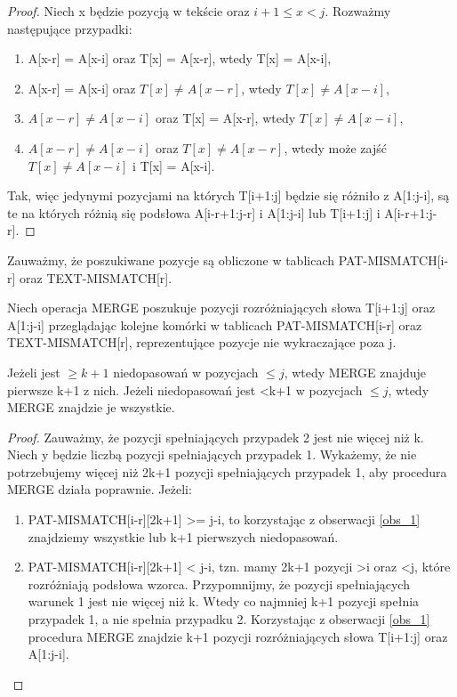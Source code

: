 \begin{proof}
Niech x będzie pozycją w tekście oraz $i+1\leq x < j$. Rozważmy następujące przypadki:
\begin{enumerate}
    \item A[x-r] = A[x-i] oraz T[x] = A[x-r], wtedy T[x] = A[x-i],
    \item A[x-r] = A[x-i] oraz $T[x] \neq A[x-r]$, wtedy $T[x] \neq A[x-i]$, 
    \item $A[x-r] \neq A[x-i]$ oraz T[x] = A[x-r], wtedy
    $T[x] \neq A[x-i]$,
    \item $A[x-r] \neq A[x-i]$ oraz $T[x] \neq A[x-r]$, wtedy może zajść $T[x] \neq A[x-i]$ i T[x] = A[x-i].
\end{enumerate}
Tak, więc jedynymi pozycjami na których T[i+1:j] będzie się różniło z A[1:j-i], są te na których różnią się podsłowa A[i-r+1:j-r] i A[1:j-i] lub T[i+1:j] i A[i-r+1:j-r].
\end{proof}

Zauważmy, że poszukiwane pozycje są obliczone w tablicach PAT-MISMATCH[i-r] oraz TEXT-MISMATCH[r].

Niech operacja MERGE poszukuje pozycji rozróżniających słowa T[i+1:j] oraz A[1:j-i] przeglądając kolejne komórki w tablicach PAT-MISMATCH[i-r] oraz TEXT-MISMATCH[r], reprezentujące pozycje nie wykraczające poza j.
\begin{lemma}{}{}
\label{lem:pozycje}
Jeżeli jest $\geq k+1$ niedopasowań w pozycjach $\leq j$, wtedy MERGE znajduje pierwsze k+1 z nich. Jeżeli niedopasowań jest <k+1 w pozycjach $\leq j$, wtedy MERGE znajdzie je wszystkie. 
\end{lemma}

\begin{proof}
Zauważmy, że pozycji spełniających przypadek 2 jest nie więcej niż k. Niech y będzie liczbą pozycji spełniających przypadek 1. Wykażemy, że nie potrzebujemy więcej niż 2k+1 pozycji spełniających przypadek 1, aby procedura MERGE działa poprawnie. Jeżeli:
\begin{enumerate}
\item PAT-MISMATCH[i-r][2k+1] >= j-i, to korzystając z obserwacji \ref{obs_1} znajdziemy wszystkie lub k+1 pierwszych niedopasowań. 
\item PAT-MISMATCH[i-r][2k+1] < j-i, tzn. mamy 2k+1 pozycji >i oraz <j, które rozróżniają podsłowa wzorca. 
Przypomnijmy, że pozycji spełniających warunek 1 jest nie więcej niż k. Wtedy co najmniej k+1 pozycji spełnia przypadek 1, a nie spełnia przypadku 2.
Korzystając z obserwacji \ref{obs_1} procedura MERGE znajdzie k+1 pozycji rozróżniających słowa T[i+1:j] oraz A[1:j-i].
\end{enumerate}
\end{proof}

